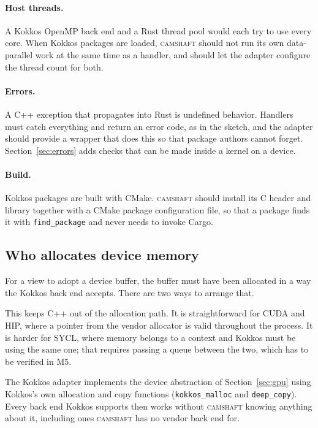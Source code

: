 \documentclass[11pt,a4paper]{article}
\newcommand{\camshaft}{\textsc{camshaft}}
\newcommand{\code}[1]{\texttt{#1}}
\begin{document}
\paragraph{Host threads.}  A Kokkos OpenMP back end and a Rust thread pool
would each try to use every core.  When Kokkos packages are loaded, \camshaft{}
should not run its own data-parallel work at the same time as a handler, and
should let the adapter configure the thread count for both.

\paragraph{Errors.}  A C++ exception that propagates into Rust is undefined
behavior.  Handlers must catch everything and return an error code, as in
the sketch, and the adapter should provide a wrapper that does this so that
package authors cannot forget.  Section~\ref{sec:errors} adds checks that
can be made inside a kernel on a device.

\paragraph{Build.}  Kokkos packages are built with CMake.  \camshaft{} should
install its C header and library together with a CMake package configuration
file, so that a package finds it with \code{find\_package} and never needs to
invoke Cargo.

\subsection{Who allocates device memory}
\label{sec:kokkos-memory}

For a view to adopt a device buffer, the buffer must have been allocated in a
way the Kokkos back end accepts.  There are two ways to arrange that.

\begin{description}[style=nextline,leftmargin=2em]
  \item[The store allocates through the vendor runtime; Kokkos adopts.]
        This keeps C++ out of the allocation path.  It is straightforward for
        CUDA and HIP, where a pointer from the vendor allocator is valid
        throughout the process.  It is harder for SYCL, where memory belongs
        to a context and Kokkos must be using the same one; that requires
        passing a queue between the two, which has to be verified in M5.
  \item[Kokkos allocates; the store records.]
        The Kokkos adapter implements the device abstraction of
        Section~\ref{sec:gpu} using Kokkos's own allocation and copy
        functions (\code{kokkos\_malloc} and \code{deep\_copy}).  Every back end Kokkos supports then works
        without \camshaft{} knowing anything about it, including ones \camshaft{} has
        no vendor back end for.
\end{description}
\end{document}
